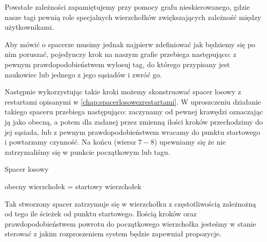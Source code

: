 Powstałe zależności zapamiętujemy przy pomocy grafu nieskierowanego, gdzie nasze tagi pewnią role specjalnych wierzchołków zwiększających zależność między użytkownikami. 

Aby mówić o spacerze musimy jednak najpierw zdefiniować jak będziemy się po nim poruszać, pojedynczy krok na naszym grafie przebiega następująco: z pewnym prawdopodobieństwem wylosuj tag, do którego przypisany jest naukowiec lub jednego z jego sąsiadów i zwróć go.

\begin{pseudokod}
\DontPrintSemicolon
{}
\end{pseudokod}

Następnie wykorzystując takie kroki możemy skonstruować spacer losowy z restartami opisanymi w \ref{chap:spacerlosowezrestartami}. W uproszczeniu działanie takiego spaceru przebiega następująco: zaczynamy od pewnej krawędzi oznaczając ją jako obecną, a potem dla zadanej przez zmienną ilości kroków przechodzimy do jej sąsiada, lub z pewnym prawdopodobieństwem wracamy do punktu startowego i powtarzamy czynność. Na końcu (wiersz $7-8$) upewniamy się że nie zatrzymaliśmy się w punkcie początkowym lub tagu.

\begin{pseudokod}[H]
\DontPrintSemicolon
\caption{Spacer losowy}
obecny wierzchołek = startowy wierzchołek\;

\end{pseudokod}

Tak stworzony spacer zatrzymuje się w wierzchołku z częstotliwością zależnożną od tego ile ścieżek od punktu startowego. Ilością kroków oraz prawdopodobieństwem powrotu do początkowego wierzchołka jesteśmy w stanie sterować z jakim rozproszeniem system będzie zapewniał propozycje.


